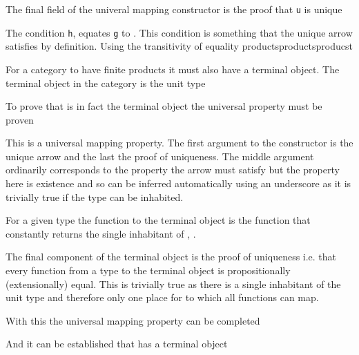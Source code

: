 
The final field of the univeral mapping constructor is the proof that \verb|u|
is unique


The condition \verb|h|, equates \verb|g| to . This condition is
something that the unique arrow satisfies by definition. Using the transitivity
of equality 
productsproductsproducst

For a category to have finite products it must also have a terminal object. The
terminal object in the category  is the unit type


To prove that  is in fact the terminal object the universal property
must be proven


This is a universal mapping property. The first argument to the constructor is
the unique arrow and the last the proof of uniqueness. The middle argument
ordinarily corresponds to the property the arrow must satisfy but the property
here is existence and so can be inferred automatically using an underscore as it
is trivially true if the type can be inhabited.

For a given type the function to the terminal object is the function that
constantly returns the single inhabitant of , .


The final component of the terminal object is the proof of uniqueness i.e. that
every function from a type to the terminal object is propositionally
(extensionally) equal. This
is trivially true as there is a single inhabitant of the unit type and therefore
only one place for to which all functions can map.


With this the universal mapping property can be completed


And it can be established that  has a terminal object

